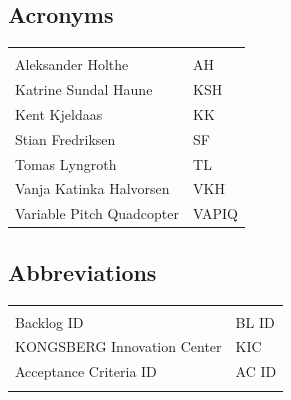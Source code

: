 \documentclass{article}
\begin{document}
\vspace*{3.0 cm}

\begin{center}
\section*{\textbf{Acronyms}}
\begin{tabular}{ll}
\rowcolor{cadetgrey}
    &   \\
Aleksander Holthe      & AH     
 \\\rowcolor{gainsboro}
Katrine Sundal Haune  & KSH \\
Kent Kjeldaas         & KK 
 \\\rowcolor{gainsboro}
Stian Fredriksen      & SF  \\
Tomas Lyngroth       & TL   
 \\\rowcolor{gainsboro}
Vanja Katinka Halvorsen     & VKH   \\
Variable Pitch Quadcopter   & VAPIQ
\end{tabular}                                                             
\end{center}

\vspace*{2cm}

\begin{center}
\section*{\textbf{Abbreviations}}
\begin{tabular}{ll}
\rowcolor{cadetgrey}
    &   \\
Backlog ID     & BL ID          \\\rowcolor{gainsboro}
KONGSBERG Innovation Center & KIC \\
Acceptance Criteria ID   & AC ID
\\\rowcolor{gainsboro}
\end{tabular}                                                             
\end{center}
\newpage
\newpage




%

\tableofcontents
\listoffigures
\listoftables
\newpage



\newpage


\newpage


\newpage


\newpage


\newpage

%
\end{document}
